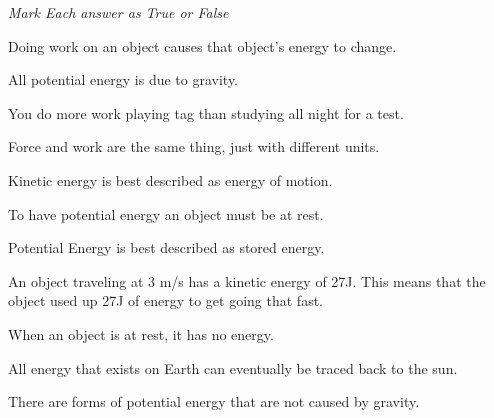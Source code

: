 \documentclass[12pt]{examdesign}
\begin{document}
\begin{truefalse} [title={True or False},
	rearrange=no]
	\textit{Mark Each answer as True or False}
	
	\begin{question}
		 Doing work on an object causes that object's energy to change.
	\end{question}
	\begin{question}
		 All potential energy is due to gravity.
	\end{question}
	\begin{question}
	 You do more work playing tag than studying all night for a test.
	\end{question}

	\begin{question}
	 Force and work are the same thing, just with different units.
	\end{question}
	\begin{question}
	 Kinetic energy is best described as energy of motion.
	\end{question}

	\begin{question}
	 To have potential energy an object must be at rest.
\end{question}
\begin{question}
	 Potential Energy is best described as stored energy.
\end{question}
\begin{question}
	 An object traveling at 3 m/s has a kinetic energy of 27J.  This means that the object used up 27J of energy to get going that fast. 
\end{question}


\begin{question}
	 When an object is at rest, it has no energy.
\end{question}


\begin{question}
	 All energy that exists on Earth can eventually be traced back to the sun.
\end{question}

\begin{question}
	 There are forms of potential energy that are not caused by gravity.
\end{question}

\end{truefalse}
\end{document}
